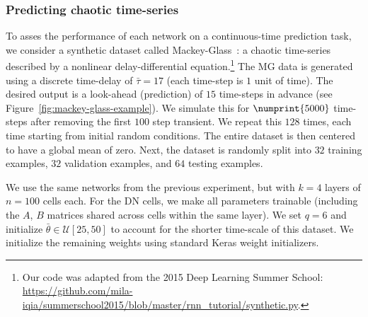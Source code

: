 \subsubsection{Predicting chaotic time-series}


\noindent 
To asses the performance of each network on a continuous-time prediction task, we consider a synthetic dataset called Mackey-Glass~\citep[MG;][]{mackey1977oscillation}: a chaotic time-series described by a nonlinear delay-differential equation.\footnote{%
Our code was adapted from the 2015 Deep Learning Summer School: \url{https://github.com/mila-iqia/summerschool2015/blob/master/rnn\_tutorial/synthetic.py}.
}
The MG data is generated using a discrete time-delay of $\bar{\tau} = 17$ (each time-step is $1$ unit of time).
The desired output is a look-ahead (prediction) of $15$ time-steps in advance (see Figure~\ref{fig:mackey-glass-example}).
We simulate this for $\numprint{5000}$ time-steps after removing the first $100$ step transient.
We repeat this $128$ times, each time starting from initial random conditions.
The entire dataset is then centered to have a global mean of zero.
Next, the dataset is randomly split into $32$ training examples, $32$ validation examples, and $64$ testing examples.

We use the same networks from the previous experiment, but with $k = 4$ layers of $n = 100$ cells each.
For the DN cells, we make all parameters trainable (including the $A$, $B$ matrices shared across cells within the same layer).
We set $q=6$ and initialize $\bar{\theta} \in \mathcal{U}[25, 50]$ to account for the shorter time-scale of this dataset.
We initialize the remaining weights using standard Keras weight initializers.

